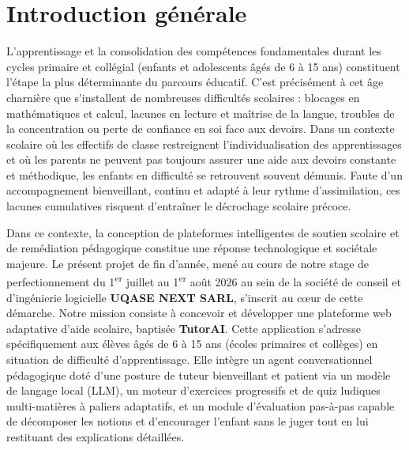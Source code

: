 \documentclass[12pt,a4paper]{report}
\begin{document}
\chapter*{Introduction générale}

L'apprentissage et la consolidation des compétences fondamentales durant les cycles primaire et collégial (enfants et adolescents âgés de 6 à 15 ans) constituent l'étape la plus déterminante du parcours éducatif. C'est précisément à cet âge charnière que s'installent de nombreuses difficultés scolaires : blocages en mathématiques et calcul, lacunes en lecture et maîtrise de la langue, troubles de la concentration ou perte de confiance en soi face aux devoirs. Dans un contexte scolaire où les effectifs de classe restreignent l'individualisation des apprentissages et où les parents ne peuvent pas toujours assurer une aide aux devoirs constante et méthodique, les enfants en difficulté se retrouvent souvent démunis. Faute d'un accompagnement bienveillant, continu et adapté à leur rythme d'assimilation, ces lacunes cumulatives risquent d'entraîner le décrochage scolaire précoce.

Dans ce contexte, la conception de plateformes intelligentes de soutien scolaire et de remédiation pédagogique constitue une réponse technologique et sociétale majeure. Le présent projet de fin d'année, mené au cours de notre stage de perfectionnement du 1\textsuperscript{er} juillet au 1\textsuperscript{er} août 2026 au sein de la société de conseil et d'ingénierie logicielle \textbf{UQASE NEXT SARL}, s'inscrit au cœur de cette démarche. Notre mission consiste à concevoir et développer une plateforme web adaptative d'aide scolaire, baptisée \textbf{TutorAI}. Cette application s'adresse spécifiquement aux élèves âgés de 6 à 15 ans (écoles primaires et collèges) en situation de difficulté d'apprentissage. Elle intègre un agent conversationnel pédagogique doté d'une posture de tuteur bienveillant et patient via un modèle de langage local (LLM), un moteur d'exercices progressifs et de quiz ludiques multi-matières à paliers adaptatifs, et un module d'évaluation pas-à-pas capable de décomposer les notions et d'encourager l'enfant sans le juger tout en lui restituant des explications détaillées.
\end{document}
